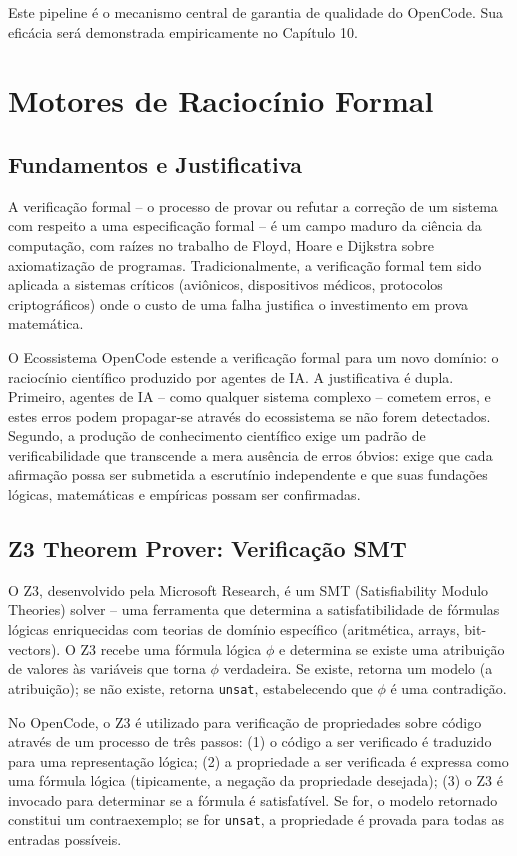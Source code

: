 \documentclass[12pt,a4paper,sumario=tradicional,openany]{abntex2}
\begin{document}
Este pipeline é o mecanismo central de garantia de qualidade do OpenCode. Sua eficácia será demonstrada empiricamente no Capítulo 10.

\section{Motores de Raciocínio Formal}

\subsection{Fundamentos e Justificativa}

A verificação formal -- o processo de provar ou refutar a correção de um sistema com respeito a uma especificação formal -- é um campo maduro da ciência da computação, com raízes no trabalho de Floyd, Hoare e Dijkstra sobre axiomatização de programas. Tradicionalmente, a verificação formal tem sido aplicada a sistemas críticos (aviônicos, dispositivos médicos, protocolos criptográficos) onde o custo de uma falha justifica o investimento em prova matemática.

O Ecossistema OpenCode estende a verificação formal para um novo domínio: o raciocínio científico produzido por agentes de IA. A justificativa é dupla. Primeiro, agentes de IA -- como qualquer sistema complexo -- cometem erros, e estes erros podem propagar-se através do ecossistema se não forem detectados. Segundo, a produção de conhecimento científico exige um padrão de verificabilidade que transcende a mera ausência de erros óbvios: exige que cada afirmação possa ser submetida a escrutínio independente e que suas fundações lógicas, matemáticas e empíricas possam ser confirmadas.

\subsection{Z3 Theorem Prover: Verificação SMT}

O Z3, desenvolvido pela Microsoft Research, é um SMT (Satisfiability Modulo Theories) solver -- uma ferramenta que determina a satisfatibilidade de fórmulas lógicas enriquecidas com teorias de domínio específico (aritmética, arrays, bit-vectors). O Z3 recebe uma fórmula lógica $\phi$ e determina se existe uma atribuição de valores às variáveis que torna $\phi$ verdadeira. Se existe, retorna um modelo (a atribuição); se não existe, retorna \texttt{unsat}, estabelecendo que $\phi$ é uma contradição.

No OpenCode, o Z3 é utilizado para verificação de propriedades sobre código através de um processo de três passos: (1) o código a ser verificado é traduzido para uma representação lógica; (2) a propriedade a ser verificada é expressa como uma fórmula lógica (tipicamente, a negação da propriedade desejada); (3) o Z3 é invocado para determinar se a fórmula é satisfatível. Se for, o modelo retornado constitui um contraexemplo; se for \texttt{unsat}, a propriedade é provada para todas as entradas possíveis.
\end{document}
